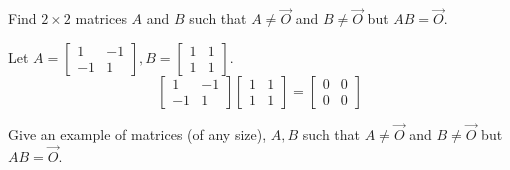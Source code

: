 \documentclass{ximera}
\begin{document}
\begin{problem}\label{prb:4.18} Find $2 \times 2$ matrices $A$ and $B$ such that $A \neq \vec{O}$ and $B \neq \vec{O}$ but $AB = \vec{O}$.
\begin{hint}
Let $A = \left[
\begin{array}{rr}
1 & -1 \\
-1 & 1
\end{array}
\right], B = \left[
\begin{array}{cc}
1 & 1 \\
1 & 1
\end{array}
\right].$
\[
\left[
\begin{array}{rr}
1 & -1 \\
-1 & 1
\end{array}
\right] \left[
\begin{array}{cc}
1 & 1 \\
1 & 1
\end{array}
\right] = \left[
\begin{array}{cc}
0 & 0 \\
0 & 0
\end{array}
\right]
\]
\end{hint}
\end{problem}

\begin{problem}\label{prb:4.19} Give an example of matrices (of any size), $A,B$ such that $A \neq \vec{O}$ and $B \neq \vec{O}$ but  $AB=\vec{O}.$
\end{problem}
\end{document}
